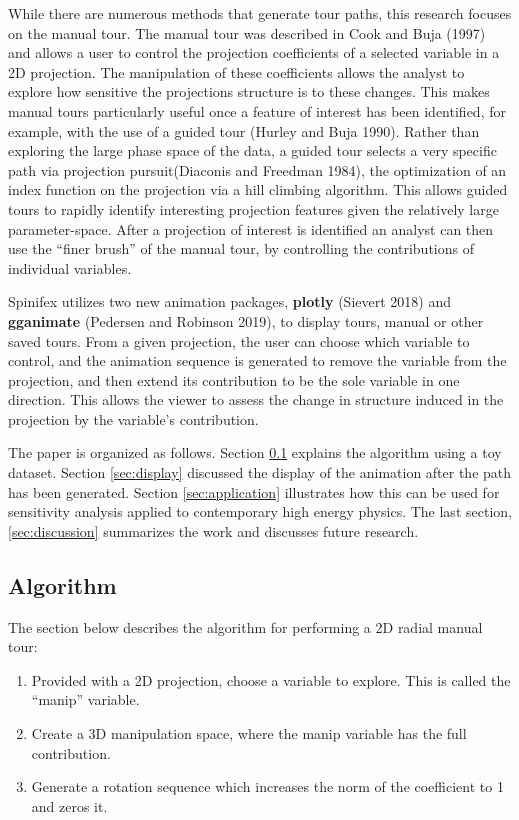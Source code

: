 While there are numerous methods that generate tour paths, this research focuses on the manual tour. The manual tour was described in Cook and Buja (1997) and allows a user to control the projection coefficients of a selected variable in a 2D projection. The manipulation of these coefficients allows the analyst to explore how sensitive the projections structure is to these changes. This makes manual tours particularly useful once a feature of interest has been identified, for example, with the use of a guided tour (Hurley and Buja 1990). Rather than exploring the large phase space of the data, a guided tour selects a very specific path via projection pursuit(Diaconis and Freedman 1984), the optimization of an index function on the projection via a hill climbing algorithm. This allows guided tours to rapidly identify interesting projection features given the relatively large parameter-space. After a projection of interest is identified an analyst can then use the ``finer brush'' of the manual tour, by controlling the contributions of individual variables.

Spinifex utilizes two new animation packages, \textbf{plotly} (Sievert 2018) and \textbf{gganimate} (Pedersen and Robinson 2019), to display tours, manual or other saved tours. From a given projection, the user can choose which variable to control, and the animation sequence is generated to remove the variable from the projection, and then extend its contribution to be the sole variable in one direction. This allows the viewer to assess the change in structure induced in the projection by the variable's contribution.

The paper is organized as follows. Section \ref{sec:algorithm} explains the algorithm using a toy dataset. Section \ref{sec:display} discussed the display of the animation after the path has been generated. Section \ref{sec:application} illustrates how this can be used for sensitivity analysis applied to contemporary high energy physics. The last section, \ref{sec:discussion} summarizes the work and discusses future research.

\hypertarget{sec:algorithm}{%
\subsection{Algorithm}\label{sec:algorithm}}

The section below describes the algorithm for performing a 2D radial manual tour:

\begin{enumerate}
\def\labelenumi{\arabic{enumi}.}
\tightlist
\item
  Provided with a 2D projection, choose a variable to explore. This is called the ``manip'' variable.
\item
  Create a 3D manipulation space, where the manip variable has the full contribution.
\item
  Generate a rotation sequence which increases the norm of the coefficient to 1 and zeros it.
\end{enumerate}


